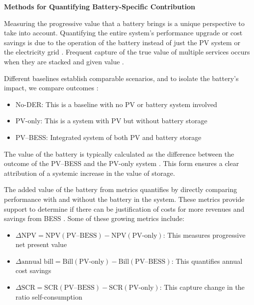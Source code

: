 \textbf{Methods for Quantifying Battery-Specific Contribution}

Measuring the progressive value that a battery brings is a unique
perspective to take into account. Quantifying the entire system's
performance upgrade or cost savings is due to the operation of the battery
instead of just the PV system or the electricity grid \cite{ch2ref031}.
Frequent capture of the true value of multiple services occurs when they
are stacked and given value \cite{ch2ref032}.

Different baselines establish comparable scenarios, and to isolate the
battery's impact, we compare outcomes \cite{ch2ref031}:

\begin{itemize}
    \item No-DER: This is a baseline with no PV or battery system involved
    \item PV-only: This is a system with PV but without battery storage
    \item PV--BESS: Integrated system of both PV and battery storage
\end{itemize}

The value of the battery is typically calculated as the difference between
the outcome of the PV--BESS and the PV-only system \cite{ch2ref031}. This
form ensures a clear attribution of a systemic increase in the value of
storage.

The added value of the battery from metrics quantifies by directly
comparing performance with and without the battery in the system. These
metrics provide support to determine if there can be justification of costs
for more revenues and savings from BESS \cite{ch2ref033}. Some of these
growing metrics include:

\begin{itemize}
    \item $\Delta\mathrm{NPV}
    = \mathrm{NPV}(\text{PV--BESS})
    - \mathrm{NPV}(\text{PV-only})$: This measures progressive net present
    value

    \item $\Delta\text{annual bill}
    = \mathrm{Bill}(\text{PV-only})
    - \mathrm{Bill}(\text{PV--BESS})$: This quantifies annual cost savings

    \item $\Delta\mathrm{SCR}
    = \mathrm{SCR}(\text{PV--BESS})
    - \mathrm{SCR}(\text{PV-only})$: This capture change in the ratio
    self-consumption
\end{itemize}

